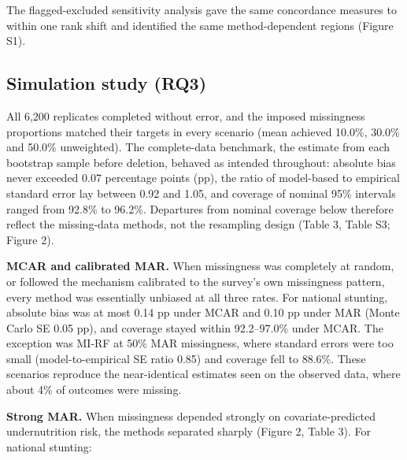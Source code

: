 \documentclass[11pt,a4paper]{article}
\begin{document}
The flagged-excluded sensitivity analysis gave the same concordance
measures to within one rank shift and identified the same
method-dependent regions (Figure S1).

\subsection{Simulation study (RQ3)}\label{simulation-study-rq3-1}

All 6,200 replicates completed without error, and the imposed
missingness proportions matched their targets in every scenario (mean
achieved 10.0\%, 30.0\% and 50.0\% unweighted). The complete-data
benchmark, the estimate from each bootstrap sample before deletion,
behaved as intended throughout: absolute bias never exceeded 0.07
percentage points (pp), the ratio of model-based to empirical standard
error lay between 0.92 and 1.05, and coverage of nominal 95\% intervals
ranged from 92.8\% to 96.2\%. Departures from nominal coverage below
therefore reflect the missing-data methods, not the resampling design
(Table 3, Table S3; Figure 2).

\textbf{MCAR and calibrated MAR.} When missingness was completely at
random, or followed the mechanism calibrated to the survey's own
missingness pattern, every method was essentially unbiased at all three
rates. For national stunting, absolute bias was at most 0.14 pp under
MCAR and 0.10 pp under MAR (Monte Carlo SE 0.05 pp), and coverage stayed
within 92.2--97.0\% under MCAR. The exception was MI-RF at 50\% MAR
missingness, where standard errors were too small (model-to-empirical SE
ratio 0.85) and coverage fell to 88.6\%. These scenarios reproduce the
near-identical estimates seen on the observed data, where about 4\% of
outcomes were missing.

\textbf{Strong MAR.} When missingness depended strongly on
covariate-predicted undernutrition risk, the methods separated sharply
(Figure 2, Table 3). For national stunting:
\end{document}
